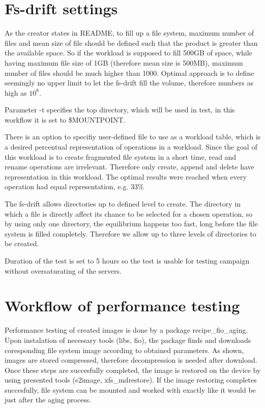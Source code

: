 \documentclass[
  color, %
  table, %
  lof,   %
  lot,   %
]{fithesis3}
\begin{document}
\section{Fs-drift settings}
As the creator states in README, to fill up a file system, maximum number of files and mean size of file should be defined such that the product is greater than the available space. So if the workload is supposed to fill 500GB of space, while having maximum file size of 1GB (therefore mean size is 500MB), maximum number of files should be much higher than 1000. Optimal approach is to define seemingly no upper limit to let the fs-drift fill the volume, therefore numbers as high as $10^8$.

Parameter -t specifies the top directory, which will be used in test, in this workflow it is set to \$MOUNTPOINT.

There is an option to specifiy user-defined file to use as a workload table, which is a desired percentual representation of operations in a workload. Since the goal of this workload is to create fragmented file system in a short time, read and rename operations are irrelevant. Therefore only create, append and delete have representation in this workload. The optimal results were reached when every operation had equal representation, e.g. 33\%

The fs-drift allows directories up to defined level to create. The directory in which a file is directly affect its chance to be selected for a chosen operation, so by using only one directory, the equilibrium happens too fast, long before the file system is filled completely. Therefore we allow up to three levels of directories to be created.

Duration of the test is set to 5 hours so the test is usable for testing campaign without oversaturating of the servers.

\section{Workflow of performance testing}
Performance testing of created images is done by a package recipe\_fio\_aging. Upon instalation of necessary tools (libs, fio), the package finds and downloads coresponding file system image according to obtained parameters. As shown, images are stored compressed, therefore decompression is needed after download. Once these steps are succesfully completed, the image is restored on the device by using presented tools (e2image, xfs\_mdrestore). If the image restoring completes succesfully, file system can be mounted and worked with exactly like it would be just after the aging process.
\end{document}

